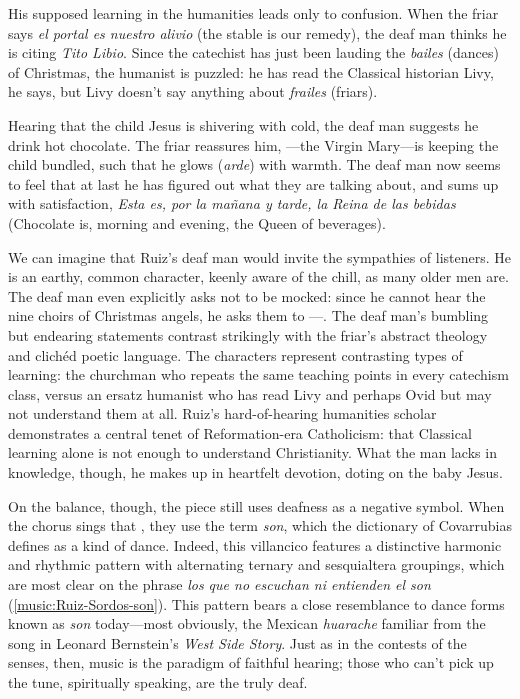His supposed learning in the humanities leads only to confusion.
When the friar says \emph{el portal es nuestro alivio} (the stable is our
remedy), the deaf man thinks he is citing \emph{Tito Libio}.
Since the catechist has just been lauding the \emph{bailes} (dances) of
Christmas, the humanist is puzzled: he has read the Classical historian Livy, he
says, but Livy doesn't say anything about \emph{frailes} (friars).

Hearing that the child Jesus is shivering with cold, the deaf man suggests he
drink hot chocolate.
The friar reassures him, ---the Virgin Mary---is keeping the
child bundled, such that he glows (\emph{arde}) with warmth.
The deaf man now seems to feel that at last he has figured out what they are
talking about, and sums up with satisfaction, \emph{Esta es, por la mañana y
tarde, la Reina de las bebidas} (Chocolate is, morning and evening, the Queen of
beverages).

We can imagine that Ruiz's deaf man would invite the sympathies of listeners.
He is an earthy, common character, keenly aware of the chill, as many older men
are.
The deaf man even explicitly asks not to be mocked: since he cannot hear the
nine choirs of Christmas angels, he asks them to ---.
The deaf man's bumbling but endearing statements contrast strikingly with the
friar's abstract theology and clichéd poetic language.
The characters represent contrasting types of learning: the churchman who
repeats the same teaching points in every catechism class, versus an ersatz
humanist who has read Livy and perhaps Ovid but may not understand them at all.
Ruiz's hard-of-hearing humanities scholar demonstrates a central tenet of
Reformation-era Catholicism: that Classical learning alone is not enough to
understand Christianity.%
    \Autocite
    [206: .] 
    {Erasmus:Dolan}
What the man lacks in knowledge, though, he makes up in heartfelt devotion,
doting on the baby Jesus.

On the balance, though, the piece still uses deafness as a negative symbol.
When the chorus sings that , they use the term \emph{son}, which the dictionary of
Covarrubias defines as a kind of dance.
Indeed, this villancico features a distinctive harmonic and rhythmic pattern
with alternating ternary and sesquialtera groupings, which are most clear on the
phrase \emph{los que no escuchan ni entienden el son}
(\cref{music:Ruiz-Sordos-son}).
This pattern bears a close resemblance to dance forms known as \emph{son}
today---most obviously, the Mexican \emph{huarache} familiar from the song
 in Leonard Bernstein's \emph{West Side Story}.%
    \Autocites
    []{Grove}
    {Wells:WestSideStory}
Just as in the contests of the senses, then, music is the paradigm of faithful
hearing; those who can't pick up the tune, spiritually speaking, are the truly
deaf.

